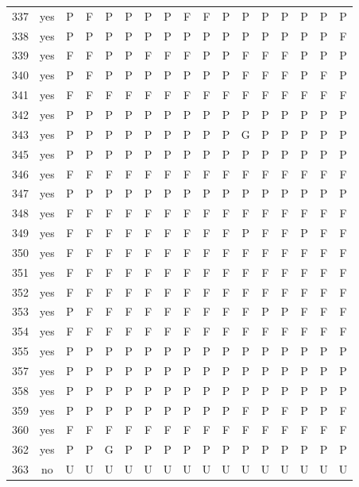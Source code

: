 \begin{table}[p]
\begin{tabular*}{\textwidth}{@{\extracolsep{\fill}}rcccccccccccccccc}
337 & yes & P & F & P & P & P & P & F & F & P & P & P & P & P & P & P\\
338 & yes & P & P & P & P & P & P & P & P & P & P & P & P & P & P & F\\
339 & yes & F & F & P & P & F & F & F & P & P & F & F & F & P & P & P\\
340 & yes & P & F & P & P & P & P & P & P & P & F & F & F & P & F & P\\
341 & yes & F & F & F & F & F & F & F & F & F & F & F & F & F & F & F\\
342 & yes & P & P & P & P & P & P & P & P & P & P & P & P & P & P & P\\
343 & yes & P & P & P & P & P & P & P & P & P & G & P & P & P & P & P\\
345 & yes & P & P & P & P & P & P & P & P & P & P & P & P & P & P & P\\
346 & yes & F & F & F & F & F & F & F & F & F & F & F & F & F & F & F\\
347 & yes & P & P & P & P & P & P & P & P & P & P & P & P & P & P & P\\
348 & yes & F & F & F & F & F & F & F & F & F & F & F & F & F & F & F\\
349 & yes & F & F & F & F & F & F & F & F & F & P & F & F & P & F & F\\
350 & yes & F & F & F & F & F & F & F & F & F & F & F & F & F & F & F\\
351 & yes & F & F & F & F & F & F & F & F & F & F & F & F & F & F & F\\
352 & yes & F & F & F & F & F & F & F & F & F & F & F & F & F & F & F\\
353 & yes & P & F & F & F & F & F & F & F & F & F & P & P & F & F & F\\
354 & yes & F & F & F & F & F & F & F & F & F & F & F & F & F & F & F\\
355 & yes & P & P & P & P & P & P & P & P & P & P & P & P & P & P & P\\
357 & yes & P & P & P & P & P & P & P & P & P & P & P & P & P & P & P\\
358 & yes & P & P & P & P & P & P & P & P & P & P & P & P & P & P & P\\
359 & yes & P & P & P & P & P & P & P & P & P & F & P & F & P & P & F\\
360 & yes & F & F & F & F & F & F & F & F & F & F & F & F & F & F & F\\
362 & yes & P & P & G & P & P & P & P & P & P & P & P & P & P & P & P\\
363 & no & U & U & U & U & U & U & U & U & U & U & U & U & U & U & U\\
\bottomrule\end{tabular*}\end{table}
\clearpage

